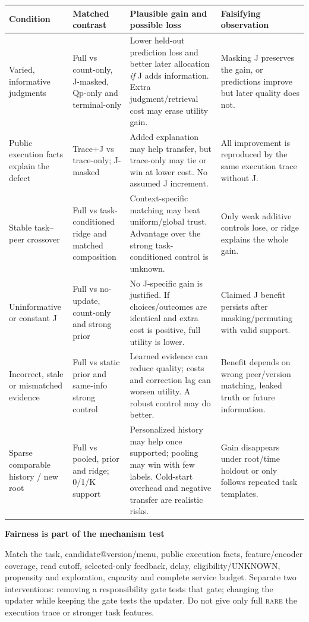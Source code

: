 \documentclass[10pt,a4paper]{article}
\newcommand{\lead}[1]{\vspace{4pt}\textbf{#1}\par}
\newcommand{\rare}{\textsc{rare}}
\begin{document}
\begin{center}\small
\begin{tabularx}{\linewidth}{@{}L{.20\linewidth}L{.22\linewidth}X L{.23\linewidth}@{}}\toprule
Condition & Matched contrast & Plausible gain and possible loss & Falsifying observation\\\midrule
Varied, informative judgments & Full vs count-only, J-masked, Qp-only and terminal-only & Lower held-out prediction loss and better later allocation \emph{if} J adds information. Extra judgment/retrieval cost may erase utility gain. & Masking J preserves the gain, or predictions improve but later quality does not.\\
Public execution facts explain the defect & Trace+J vs trace-only; J-masked & Added explanation may help transfer, but trace-only may tie or win at lower cost. No assumed J increment. & All improvement is reproduced by the same execution trace without J.\\
Stable task--peer crossover & Full vs task-conditioned ridge and matched composition & Context-specific matching may beat uniform/global trust. Advantage over the strong task-conditioned control is unknown. & Only weak additive controls lose, or ridge explains the whole gain.\\
Uninformative or constant J & Full vs no-update, count-only and strong prior & No J-specific gain is justified. If choices/outcomes are identical and extra cost is positive, full utility is lower. & Claimed J benefit persists after masking/permuting with valid support.\\
Incorrect, stale or mismatched evidence & Full vs static prior and same-info strong control & Learned evidence can reduce quality; costs and correction lag can worsen utility. A robust control may do better. & Benefit depends on wrong peer/version matching, leaked truth or future information.\\
Sparse comparable history / new root & Full vs pooled, prior and ridge; 0/1/K support & Personalized history may help once supported; pooling may win with few labels. Cold-start overhead and negative transfer are realistic risks. & Gain disappears under root/time holdout or only follows repeated task templates.\\\bottomrule
\end{tabularx}\end{center}

\lead{Fairness is part of the mechanism test}
Match the task, candidate@version/menu, public execution facts, feature/encoder
coverage, read cutoff, selected-only feedback, delay, eligibility/UNKNOWN,
propensity and exploration, capacity and complete service budget. Separate
two interventions: removing a responsibility gate tests that gate; changing the
updater while keeping the gate tests the updater. Do not give only full \rare{}
the execution trace or stronger task features.
\end{document}
